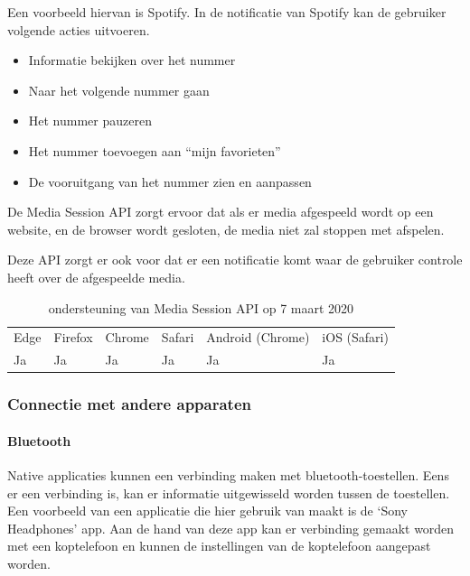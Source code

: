 	Een voorbeeld hiervan is Spotify. In de notificatie van Spotify kan de gebruiker volgende acties uitvoeren.
	 \begin{itemize}
	   \item	Informatie bekijken over het nummer
	   \item	Naar het volgende nummer gaan
	   \item	Het nummer pauzeren
	   \item	Het nummer toevoegen aan “mijn favorieten”
	   \item	De vooruitgang van het nummer zien en aanpassen
	\end{itemize}
	De Media Session API \autocite{Beaufort2019} zorgt ervoor dat als er media afgespeeld wordt op een website, en de browser wordt gesloten, de media niet zal stoppen met afspelen.
	
	Deze API zorgt er ook voor dat er een notificatie komt waar de gebruiker controle heeft over de afgespeelde media. 
	
	
	\begin{table}[H]
		\centering
		\begin{tabular}{llllll}
			Edge & Firefox & Chrome & Safari & Android (Chrome) & iOS (Safari) \\
			Ja   & Ja      & Ja     & Ja     & Ja               & Ja          
		\end{tabular}	
		\caption{ondersteuning van Media Session API op 7 maart 2020}
	\end{table}
	
	
	
	\subsubsection{Connectie met andere apparaten}
	
	
	
	\paragraph{Bluetooth }
	
	Native applicaties kunnen een verbinding maken met bluetooth-toestellen. Eens er een verbinding is, kan er informatie uitgewisseld worden tussen de toestellen. Een voorbeeld van een applicatie die hier gebruik van maakt is de ‘Sony Headphones’ app. Aan de hand van deze app kan er verbinding gemaakt worden met een koptelefoon en kunnen de instellingen van de koptelefoon aangepast worden.
	
